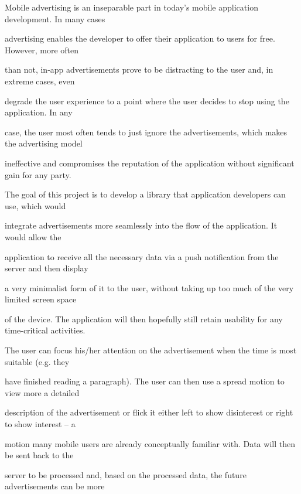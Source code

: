 


\begin{abstracts}        %
Mobile advertising is an inseparable part in today’s mobile application development. In many cases

advertising enables the developer to offer their application to users for free. However, more often

than not, in-app advertisements prove to be distracting to the user and, in extreme cases, even

degrade the user experience to a point where the user decides to stop using the application. In any

case, the user most often tends to just ignore the advertisements, which makes the advertising model

ineffective and compromises the reputation of the application without significant gain for any party.

The goal of this project is to develop a library that application developers can use, which would

integrate advertisements more seamlessly into the flow of the application. It would allow the

application to receive all the necessary data via a push notification from the server and then display

a very minimalist form of it to the user, without taking up too much of the very limited screen space

of the device. The application will then hopefully still retain usability for any time-critical activities.

The user can focus his/her attention on the advertisement when the time is most suitable (e.g. they

have finished reading a paragraph). The user can then use a spread motion to view more a detailed

description of the advertisement or flick it either left to show disinterest or right to show interest – a

motion many mobile users are already conceptually familiar with. Data will then be sent back to the

server to be processed and, based on the processed data, the future advertisements can be more


\end{abstracts}
